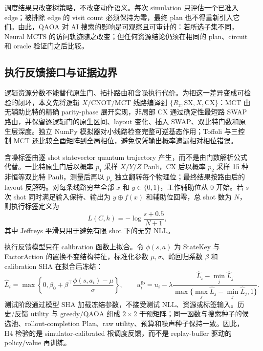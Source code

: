 \documentclass[UTF8,fontset=fandol,11pt]{ctexart}
\newcommand{\mcts}{\ensuremath{\mathrm{MCTS}}}
\newcommand{\qaoa}{\ensuremath{\mathrm{QAOA}}}
\newcommand{\xor}{\ensuremath{\oplus}}
\newcommand{\rz}{\ensuremath{R_z}}
\begin{document}
调度结果只改变树策略，不改变动作语义。每次 simulation 只评估一个已准入 edge；被排除 edge 的 visit count 必须保持为零，最终 plan 也不得重新引入它们。由此，\qaoa{} 对 AI 搜索的影响是可观察且可审计的：若所选子集不同，Neural \mcts{} 的访问轨迹随之改变；但任何资源结论仍须在相同的 plan、circuit 和 oracle 验证门之后比较。

\subsection{执行反馈接口与证据边界}

逻辑资源分数不能替代原生门、拓扑路由和含噪执行代价。为把这一差异变成可检验的闭环，本文先将逻辑 $X$/CNOT/MCT 线路编译到 $\{\rz,\mathrm{SX},X,\mathrm{CX}\}$：MCT 由无辅助比特的精确 parity-phase 展开实现，非局部 CX 通过确定性最短路 SWAP 路由，并保留逐逻辑门的原生区间、layout 变化、插入 SWAP、双比特门数和原生层深度。独立 NumPy 模拟器对小线路检查完整可逆基态作用；Toffoli 与三控制 MCT 还比较全酉矩阵到全局相位，避免仅凭输出概率遗漏相对相位错误。

含噪标签由逐 shot statevector quantum trajectory 产生，而不是由门数解析公式代替。一比特原生门后以概率 $p_1$ 采样 $X/Y/Z$ Pauli，CX 后以概率 $p_2$ 采样 15 种非恒等双比特 Pauli，测量后再以 $p_r$ 独立翻转每个物理位；最终结果按路由后的 layout 反解码。对每条线路穷举全部 $x$ 和 $y\in\{0,1\}$，工作辅助位从 0 开始。若 $s$ 次 shot 同时满足输入保持、输出为 $y\xor f(x)$ 和辅助位回零，总 shot 数为 $N$，则执行标签定义为
\begin{equation}
L(C,h)=-\log\frac{s+0.5}{N+1},
\label{eq:execution-nll}
\end{equation}
其中 Jeffreys 平滑只用于避免有限 shot 下的无穷 NLL。

执行反馈模型只在 calibration 函数上拟合。令 $\phi(s,a)$ 为 StateKey 与 FactorAction 的置换不变结构特征，标准化参数 $\mu,\sigma$、岭回归系数 $\beta$ 和 calibration SHA 在拟合后冻结：
\begin{equation}
\widehat L_i=\max\!\left\{0,\beta_0+
\beta^\top\frac{\phi(s,a_i)-\mu}{\sigma}\right\},\qquad
u_i^{\mathrm{fb}}=u_i-\lambda
\frac{\widehat L_i-\min_j\widehat L_j}
{\max\{\max_j\widehat L_j-\min_j\widehat L_j,1\}}.
\label{eq:execution-feedback}
\end{equation}
测试阶段通过模型 SHA 加载冻结参数，不接受测试 NLL、资源或标签输入。历史/反馈 utility 与 greedy/\qaoa{} 组成 $2\times2$ 干预矩阵；同一函数与搜索种子的候选池、rollout-completion Plan、raw utility、预算和噪声种子保持一致。因此，H4 检验的是 simulator-calibrated 根调度反馈，而不是 replay-buffer 驱动的 policy/value 再训练。
\end{document}
